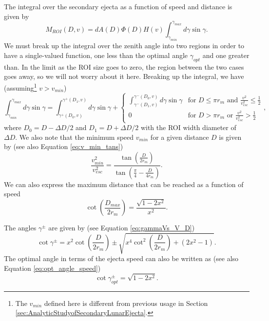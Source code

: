 \documentclass{hitec}
\numberwithin{equation}{section}
\begin{document}
The integral over the secondary ejecta as a function of speed and distance is given by
\begin{equation}
M_{ROI}(D,v) = dA(D)\Phi(D)H(v)\int_{\gamma_{min}}^{\gamma_{max}}d\gamma\sin\gamma.
\end{equation}
We must break up the integral over the zenith angle into two regions in order to have a single-valued function, one less than the optimal angle $\gamma_{opt}$ and one greater than. In the limit as the ROI size goes to zero, the region between the two cases goes away, so we will not worry about it here. Breaking up the integral, we have (assuming\footnote{The $v_{min}$ defined here is different from previous usage in Section \ref{sec:AnalyticStudyofSecondaryLunarEjecta}.} $v>v_{min}$)
\begin{equation}
\int_{\gamma_{min}}^{\gamma_{max}}d\gamma\sin\gamma
= \int_{\gamma^+(D_0,v)}^{\gamma^+(D_1,v)}d\gamma\sin\gamma
+ \begin{cases}
\int_{\gamma^-(D_1,v)}^{\gamma^-(D_0,v)}d\gamma\sin\gamma& \text{for $D \le \pi r_m $ and $\frac{v^2}{v_{esc}^2} \le \frac{1}{2}$}\\
0 &\text{for $D > \pi r_m $ or $\frac{v^2}{v_{esc}^2} > \frac{1}{2}$}
\end{cases},
\end{equation}
where $D_0 = D - \Delta D/2$ and $D_1 = D + \Delta D/2$ with the ROI width diameter of $\Delta D$. We also note that the minimum speed $v_{min}$ for a given distance $D$ is given by (see also Equation \eqref{eq:v_min_tans})
\begin{equation}
\frac{v_{min}^2}{v_{esc}^2} = \frac{\tan\left(\frac{D}{2r_m}\right)}{\tan\left(\frac{\pi}{4}-\frac{D}{4r_m}\right)}.
\end{equation}
We can also express the maximum distance that can be reached as a function of speed
\begin{equation}
\cot\left(\frac{D_{max}}{2r_m}\right) = \frac{\sqrt{1-2x^2}}{x^2}.
\end{equation}

The angles $\gamma^{\pm}$ are given by (see Equation \eqref{eq:gammaVs_V_D})
\begin{equation}\label{eq:gammaVs_V_D-repeat}
\cot\gamma^\pm = x^2\cot\left(\frac{D}{2r_m}\right) \pm \sqrt{x^4\cot^2\left(\frac{D}{2r_m}\right) + (2x^2-1)}.
\end{equation}
The optimal angle in terms of the ejecta speed can also be written as (see also Equation \eqref{eq:opt_angle_speed})
\begin{equation}
\cot\gamma_{opt}^\pm = \sqrt{1-2x^2}.
\end{equation}
\end{document}
